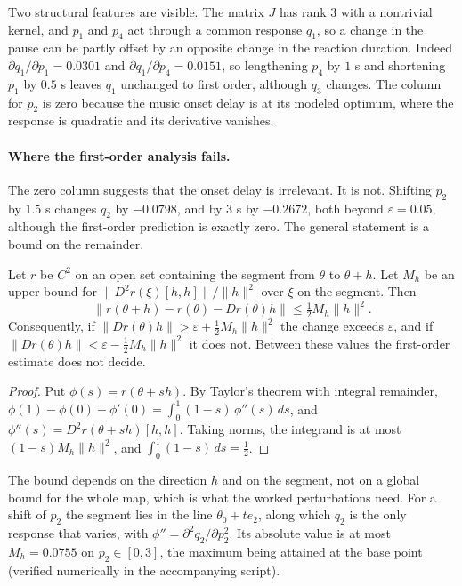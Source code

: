 Two structural features are visible. The matrix $J$ has rank $3$ with a nontrivial kernel, and $p_1$ and $p_4$ act through a common response $q_1$, so a change in the pause can be partly offset by an opposite change in the reaction duration. Indeed $\partial q_1/\partial p_1=0.0301$ and $\partial q_1/\partial p_4=0.0151$, so lengthening $p_4$ by $1$ s and shortening $p_1$ by $0.5$ s leaves $q_1$ unchanged to first order, although $q_3$ changes. The column for $p_2$ is zero because the music onset delay is at its modeled optimum, where the response is quadratic and its derivative vanishes.

\paragraph{Where the first-order analysis fails.} The zero column suggests that the onset delay is irrelevant. It is not. Shifting $p_2$ by $1.5$ s changes $q_2$ by $-0.0798$, and by $3$ s by $-0.2672$, both beyond $\varepsilon=0.05$, although the first-order prediction is exactly zero. The general statement is a bound on the remainder.

\begin{proposition}\label{prop:taylor}
Let $r$ be $C^2$ on an open set containing the segment from $\theta$ to $\theta+h$. Let $M_h$ be an upper bound for $\lVert D^2r(\xi)[h,h]\rVert/\lVert h\rVert^2$ over $\xi$ on the segment. Then
\[
\bigl\lVert r(\theta+h)-r(\theta)-Dr(\theta)h\bigr\rVert\le\tfrac12M_h\lVert h\rVert^2 .
\]
Consequently, if $\lVert Dr(\theta)h\rVert>\varepsilon+\tfrac12M_h\lVert h\rVert^2$ the change exceeds $\varepsilon$, and if $\lVert Dr(\theta)h\rVert<\varepsilon-\tfrac12M_h\lVert h\rVert^2$ it does not. Between these values the first-order estimate does not decide.
\end{proposition}

\begin{proof}
Put $\phi(s)=r(\theta+sh)$. By Taylor's theorem with integral remainder, $\phi(1)-\phi(0)-\phi'(0)=\int_0^1(1-s)\,\phi''(s)\,ds$, and $\phi''(s)=D^2r(\theta+sh)[h,h]$. Taking norms, the integrand is at most $(1-s)M_h\lVert h\rVert^2$, and $\int_0^1(1-s)\,ds=\tfrac12$.
\end{proof}

The bound depends on the direction $h$ and on the segment, not on a global bound for the whole map, which is what the worked perturbations need. For a shift of $p_2$ the segment lies in the line $\theta_0+te_2$, along which $q_2$ is the only response that varies, with $\phi''=\partial^2q_2/\partial p_2^2$. Its absolute value is at most $M_h=0.0755$ on $p_2\in[0,3]$, the maximum being attained at the base point (verified numerically in the accompanying script).

